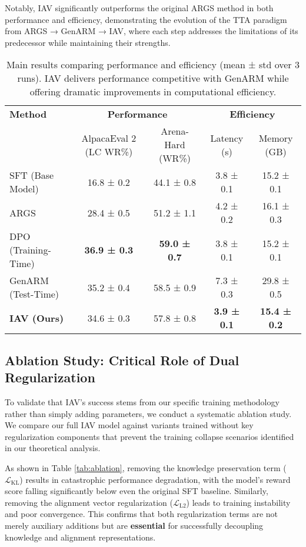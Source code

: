 \documentclass{article}
\begin{document}
Notably, IAV significantly outperforms the original ARGS method in both performance and efficiency, demonstrating the evolution of the TTA paradigm from ARGS → GenARM → IAV, where each step addresses the limitations of its predecessor while maintaining their strengths.

\begin{table}[h!]
\centering
\caption{Main results comparing performance and efficiency (mean ± std over 3 runs). IAV delivers performance competitive with GenARM while offering dramatic improvements in computational efficiency.}
\label{tab:main_results}
\begin{tabular}{@{}l|cc|cc@{}}
\toprule
\textbf{Method} & \multicolumn{2}{c|}{\textbf{Performance}} & \multicolumn{2}{c}{\textbf{Efficiency}} \\
 & AlpacaEval 2 (LC WR\%) & Arena-Hard (WR\%) & Latency (s) & Memory (GB) \\
\midrule
SFT (Base Model) & 16.8 ± 0.2 & 44.1 ± 0.8 & 3.8 ± 0.1 & 15.2 ± 0.1 \\
ARGS & 28.4 ± 0.5 & 51.2 ± 1.1 & 4.2 ± 0.2 & 16.1 ± 0.3 \\
DPO (Training-Time) & \textbf{36.9 ± 0.3} & \textbf{59.0 ± 0.7} & 3.8 ± 0.1 & 15.2 ± 0.1 \\
GenARM (Test-Time) & 35.2 ± 0.4 & 58.5 ± 0.9 & 7.3 ± 0.3 & 29.8 ± 0.5 \\
\textbf{IAV (Ours)} & 34.6 ± 0.3 & 57.8 ± 0.8 & \textbf{3.9 ± 0.1} & \textbf{15.4 ± 0.2} \\
\bottomrule
\end{tabular}
\end{table}

\subsection{Ablation Study: Critical Role of Dual Regularization}
To validate that IAV's success stems from our specific training methodology rather than simply adding parameters, we conduct a systematic ablation study. We compare our full IAV model against variants trained without key regularization components that prevent the training collapse scenarios identified in our theoretical analysis.

As shown in Table \ref{tab:ablation}, removing the knowledge preservation term ($\mathcal{L}_{\text{KL}}$) results in catastrophic performance degradation, with the model's reward score falling significantly below even the original SFT baseline. Similarly, removing the alignment vector regularization ($\mathcal{L}_{\text{L2}}$) leads to training instability and poor convergence. This confirms that both regularization terms are not merely auxiliary additions but are \textbf{essential} for successfully decoupling knowledge and alignment representations.
\end{document}
